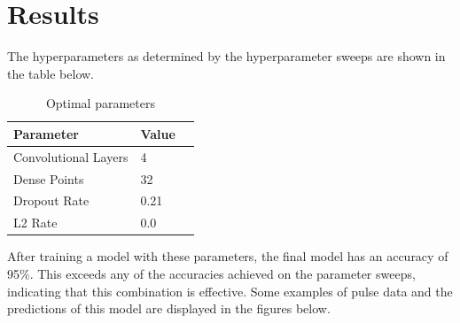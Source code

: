 \documentclass{article}
\begin{document}
\section{Results}

The hyperparameters as determined by the hyperparameter sweeps are shown in the table below. 

\begin{table}[H]
    \caption{Optimal parameters}
    \label{results}
    \centering
    \begin{tabular}{lll}
      \toprule
      Parameter     & Value  \\
      \midrule
      Convolutional Layers & 4     \\
      Dense Points     & 32     \\
      Dropout Rate     & 0.21  \\
      L2 Rate     & 0.0  \\
      \bottomrule
    \end{tabular}
  \end{table}

After training a model with these parameters, the final model has an accuracy of 95\%. This exceeds any of the accuracies achieved on the parameter sweeps, indicating that this combination is effective. Some examples of pulse data and the predictions of this model are displayed in the figures below.
\end{document}
